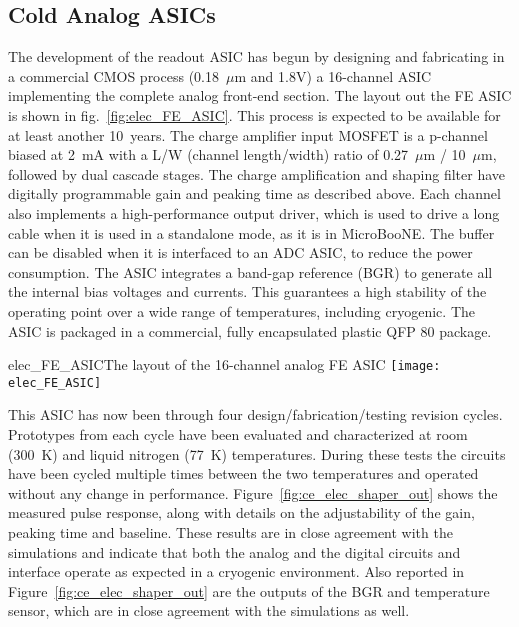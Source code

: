 %
\subsection{Cold Analog ASICs}
\label{subsec:fe_CMOS_analog}

The development of the readout ASIC has begun by designing and fabricating in a commercial CMOS
process (0.18~$\mu$m and 1.8V) a 16-channel ASIC implementing the complete analog front-end section.
The layout out the FE ASIC is shown in fig.~\ref{fig:elec_FE_ASIC}.  %
This process is expected to be available for at least another 10~years. 
The charge amplifier input MOSFET is a p-channel biased at 2~mA with a L/W (channel length/width) ratio
of 0.27~$\mu$m / 10~$\mu$m, followed by dual cascade stages.
The charge amplification and shaping filter have
digitally programmable gain and peaking time as described above.
Each channel also implements a high-performance output driver,
which is used to drive a long cable when it is used in a standalone mode, as it is in MicroBooNE.
The buffer can be disabled when it is interfaced to an ADC ASIC, to reduce the power consumption.
The ASIC integrates a band-gap reference (BGR) to generate all the internal bias voltages and currents.
This guarantees a high stability of the operating point over a wide range of
temperatures, including cryogenic.
The ASIC is packaged in a commercial, fully encapsulated plastic QFP 80 package.

\begin{cdrfigure}{elec_FE_ASIC}{The layout of the 16-channel analog FE ASIC}
\texttt{[image: elec\_FE\_ASIC]} %
\end{cdrfigure}

This ASIC has now been through four design/fabrication/testing revision cycles.
Prototypes from each cycle have been evaluated and characterized at room (300~K) and liquid nitrogen (77~K) temperatures.
During these tests the circuits have been cycled multiple times
between the two temperatures and operated without any change in performance.
Figure~\ref{fig:ce_elec_shaper_out} shows the measured pulse response, along with
details on the adjustability of the gain, peaking time and baseline.
These results are in close agreement with the simulations and indicate
that both the analog and the digital circuits and interface operate as
expected in a cryogenic environment.
Also reported in Figure~\ref{fig:ce_elec_shaper_out} are the outputs of the BGR and temperature sensor,
which are in close agreement with the simulations as well.

